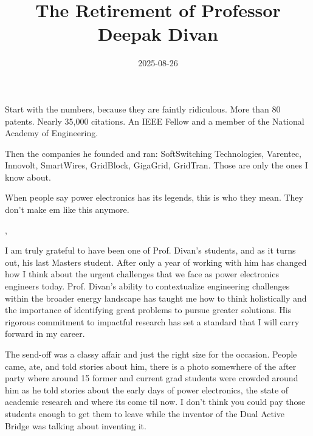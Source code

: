 
\title{The Retirement of Professor Deepak Divan}
\date{2025-08-26}




Start with the numbers, because they are faintly ridiculous. More than 80
patents. Nearly 35,000 citations. An IEEE Fellow and a member of the National
Academy of Engineering.

Then the companies he founded and ran: SoftSwitching Technologies, Varentec,
Innovolt, SmartWires, GridBlock, GigaGrid, GridTran. Those are only the ones I
know about.


When people say power electronics has its legends, this is who they mean. They don't make em like this anymore.

\sep

I am truly grateful to have been one of Prof. Divan's students, and as
it turns out, his last Masters student. After only a year of working with him has changed how I think
about the urgent challenges that we face as power electronics engineers today. Prof. Divan's ability to contextualize engineering challenges within the broader energy landscape has taught me how to think holistically and the importance of identifying great problems to pursue greater solutions. His rigorous commitment to impactful research has set a standard that I will carry forward in my career.


The send-off was a classy affair and just the right size for the occasion. People came, ate, and told
stories about him, there is a photo somewhere of the after party where around 15 former and current grad students were crowded around him as he told stories about the early days of power electronics, the state of academic research and where its come til now. I don't think you could pay those students enough to get them to leave while the inventor of the Dual Active Bridge was talking about inventing it.

